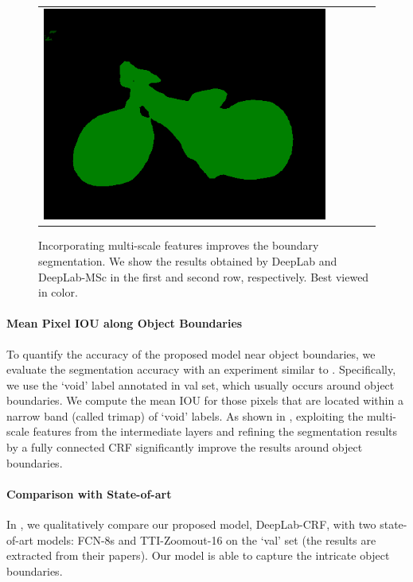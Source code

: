 \begin{figure}[ht]
\begin{tabular}{c c c c c}
    \includegraphics[height=0.11\linewidth]{fig/boundary_refine/vgg128ms_2009_000573.png} \\
  \end{tabular}
  \caption{Incorporating multi-scale features improves the boundary segmentation. We show the results obtained by DeepLab and DeepLab-MSc in the first and second row, respectively. Best viewed in color.}
  \label{fig:msBoundary}
\end{figure}


\paragraph{Mean Pixel IOU along Object Boundaries}
To quantify the accuracy of the proposed model near object boundaries, we evaluate the segmentation accuracy with an experiment similar to \citet{kohli2009robust, krahenbuhl2011efficient}. Specifically, we  use  the `void' label annotated in val set, which usually occurs around object boundaries. We compute the mean IOU for those pixels that are located within a narrow band (called trimap) of `void' labels. As shown in , exploiting the multi-scale features from the intermediate layers and refining the segmentation results by a fully connected CRF significantly improve the results around object boundaries. 

\paragraph{Comparison with State-of-art} In , we qualitatively compare our proposed model, DeepLab-CRF, with two state-of-art models: FCN-8s \citep{long2014fully} and TTI-Zoomout-16 \citep{mostajabi2014feedforward} on the `val' set (the results are extracted from their papers). Our model is able to capture the intricate object boundaries.

